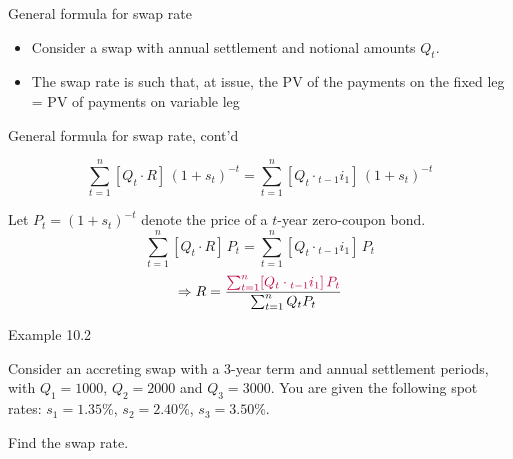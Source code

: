 \documentclass{beamer}
\begin{document}
\begin{frame}{General formula for swap rate}

\begin{itemize}
\item Consider a swap with annual settlement and notional amounts $Q_t$.
\item The swap rate is such that, at issue, the PV of the payments on the fixed leg = PV of payments on variable leg
\end{itemize}

\begin{center}
\end{center}

\vfill
\end{frame}

\begin{frame}{General formula for swap rate, cont'd}

\[
\sum_{t=1}^{n} [Q_t \cdot R]\,(1+s_t)^{-t} = \sum_{t=1}^{n} [Q_t \cdot {}_{t-1}i_1]\,(1+s_t)^{-t}
\]

Let $P_t = (1+s_t)^{-t}$ denote the price of a $t$-year zero-coupon bond.
\[
\sum_{t=1}^{n} [Q_t \cdot R]\,P_t = \sum_{t=1}^{n} [Q_t \cdot {}_{t-1}i_1]\,P_t
\]
\[
\Rightarrow R = \frac{\textcolor{purple}{\sum_{t=1}^{n} [Q_t \cdot {}_{t-1}i_1]\,P_t}}{\sum_{t=1}^{n} Q_t P_t}
\]

\end{frame}

\begin{frame}{Example 10.2}

Consider an accreting swap with a 3-year term and annual settlement periods, with $Q_1 = 1000$, $Q_2 = 2000$ and $Q_3 = 3000$. You are given the following spot rates: $s_1 = 1.35\%$, $s_2 = 2.40\%$, $s_3 = 3.50\%$.

\medskip
Find the swap rate.

\vspace{1em}
\begin{center}
\end{center}

\vfill
\end{frame}
\end{document}
